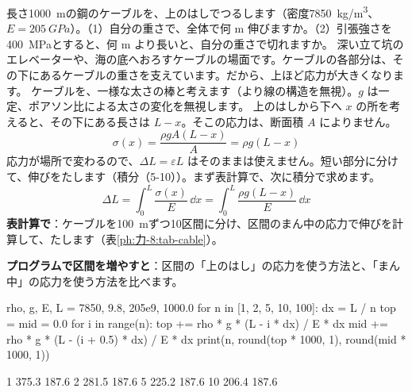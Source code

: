 \begin{phreidai}[自分の重さで伸びるケーブル]
\label{ph:力-8:ex12}長さ\qty{1000}{m}の鋼のケーブルを、上のはしでつるします（密度\qty{7850}{kg/m^3}、$E=\qty{205}{GPa}$）。（1）自分の重さで、全体で何 m 伸びますか。（2）引張強さを\qty{400}{MPa}とすると、何 m より長いと、自分の重さで切れますか。
\phbamen
深い立て坑のエレベーターや、海の底へおろすケーブルの場面です。ケーブルの各部分は、その下にあるケーブルの重さを支えています。だから、上ほど応力が大きくなります。
\phmushi
ケーブルを、一様な太さの棒と考えます（より線の構造を無視）。$g$ は一定、ポアソン比による太さの変化を無視します。
\phzu
上のはしから下へ $x$ の所を考えると、その下にある長さは $L-x$。そこの応力は、断面積 $A$ によりません。
\[\sigma(x)=\frac{\rho gA(L-x)}{A}=\rho g(L-x)\]
\phriyu
応力が場所で変わるので、$\Delta L=\varepsilon L$ はそのままは使えません。短い部分に分けて、伸びをたします（積分（5-10））。まず表計算で、次に積分で求めます。
\phtateru
\[\Delta L=\int_0^L\frac{\sigma(x)}{E}\,\dd x=\int_0^L\frac{\rho g(L-x)}{E}\,\dd x\]
\phtoku
\textbf{表計算で}：ケーブルを\qty{100}{m}ずつ10区間に分け、区間のまん中の応力で伸びを計算して、たします（表\ref{ph:力-8:tab-cable}）。
\begin{bkcenter}
\label{ph:力-8:tab-cable}
\end{bkcenter}
\textbf{プログラムで区間を増やすと}：区間の「上のはし」の応力を使う方法と、「まん中」の応力を使う方法を比べます。
\begin{phcode}
rho, g, E, L = 7850, 9.8, 205e9, 1000.0
for n in [1, 2, 5, 10, 100]:
    dx = L / n
    top = mid = 0.0
    for i in range(n):
        top += rho * g * (L - i * dx) / E * dx
        mid += rho * g * (L - (i + 0.5) * dx) / E * dx
    print(n, round(top * 1000, 1), round(mid * 1000, 1))
\end{phcode}
\begin{phcodeout}
1 375.3 187.6
2 281.5 187.6
5 225.2 187.6
10 206.4 187.6

\end{phcodeout}
\end{phreidai}
